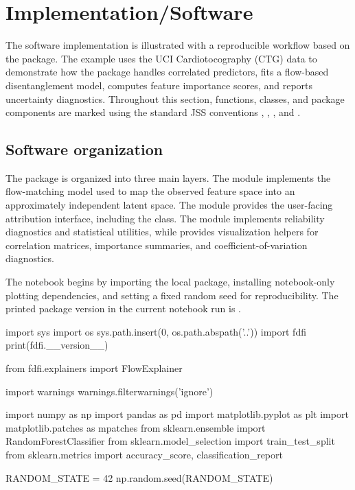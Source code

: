 \section{Implementation/Software} \label{sec:models}

The software implementation is illustrated with a reproducible
 workflow based on the  package. The example uses
the UCI Cardiotocography (CTG) data to demonstrate how the package handles
correlated predictors, fits a flow-based disentanglement model, computes
feature importance scores, and reports uncertainty diagnostics. Throughout
this section, functions, classes, and package components are marked using the
standard JSS conventions , , , and
.

\subsection{Software organization}

The  package is organized into three main layers. The module
 implements the flow-matching model used to map the observed
feature space into an approximately independent latent space. The module
 provides the user-facing attribution interface,
including the  class. The module 
implements reliability diagnostics and statistical utilities, while
 provides visualization helpers for correlation matrices,
importance summaries, and coefficient-of-variation diagnostics.

The notebook begins by importing the local package, installing notebook-only
plotting dependencies, and setting a fixed random seed for reproducibility.
The printed package version in the current notebook run is .
%
\begin{Code}


import sys
import os
sys.path.insert(0, os.path.abspath('..'))
import fdfi
print(fdfi.__version__)

from fdfi.explainers import FlowExplainer

import warnings
warnings.filterwarnings('ignore')

import numpy as np
import pandas as pd
import matplotlib.pyplot as plt
import matplotlib.patches as mpatches
from sklearn.ensemble import RandomForestClassifier
from sklearn.model_selection import train_test_split
from sklearn.metrics import accuracy_score, classification_report

RANDOM_STATE = 42
np.random.seed(RANDOM_STATE)
\end{Code}

